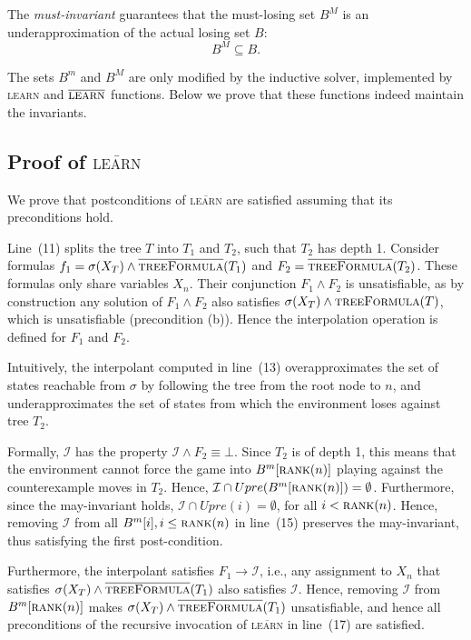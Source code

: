 \documentclass{llncs}
\newcommand{\II}{\mathcal{I}}
\newcommand{\textoverline}[1]{$\overline{\mbox{#1}}$}
\begin{document}
The \emph{must-invariant} guarantees that the must-losing set $B^M$ is an
underapproximation of the actual losing set $B$: $$B^M \subseteq B.$$

The sets $B^m$ and $B^M$ are only modified by the inductive solver, implemented
by \textsc{learn} and \textoverline{\textsc{learn}} functions.  Below we prove that these
functions indeed maintain the invariants.

\subsection{Proof of \textsc{\textoverline{learn}}}

We prove that postconditions of \textsc{\textoverline{learn}} are satisfied
assuming that its preconditions hold.

Line~(11) splits the tree $T$ into $T_1$ and $T_2$, such that $T_2$ has depth
1.  Consider formulas $f_1=\sigma(X_T) \land
\textsc{\textoverline{treeFormula}}(T_1)$ and $F_2 =
\textsc{\textoverline{treeFormula}}(T_2)$.  These formulas only share variables
$X_n$.  Their conjunction $F_1 \land F_2$ is unsatisfiable, as by construction
any solution of $F_1 \land F_2$ also satisfies $\sigma(X_T) \land
\textsc{treeFormula}(T)$, which is unsatisfiable (precondition (b)).  Hence the
interpolation operation is defined for $F_1$ and $F_2$.  

Intuitively, the interpolant computed in line~(13) overapproximates the set of
states reachable from $\sigma$ by following the tree from the root node to $n$,
and underapproximates the set of states from which the environment loses
against tree $T_2$.  

Formally, $\II$ has the property $\II \land F_2 \equiv \bot$.  Since $T_2$ is
of depth 1, this means that the environment cannot force the game into
$B^m[\textsc{rank}(n)]$ playing against the counterexample moves in $T_2$.
Hence, $\II \cap Upre(B^m[\textsc{rank}(n)]) = \emptyset$.  Furthermore, since
the may-invariant holds, $\II \cap Upre(i) = \emptyset$, for all $i <
\textsc{rank}(n)$.  Hence, removing $\II$ from all $B^m[i], i\leq
\textsc{rank}(n)$ in line~(15) preserves the may-invariant, thus satisfying the
first post-condition.

Furthermore, the interpolant satisfies $F_1 \rightarrow \II$, i.e., any
assignment to $X_n$ that satisfies $\sigma(X_T) \land
\textsc{\textoverline{treeFormula}}(T_1)$ also satisfies $\II$.  Hence,
removing $\II$ from $B^m[\textsc{rank}(n)]$ makes $\sigma(X_T) \land
\textsc{\textoverline{treeFormula}}(T_1)$ unsatisfiable, and hence all
preconditions of the recursive invocation of \textsc{\textoverline{learn}} in
line~(17) are satisfied.  
\end{document}
